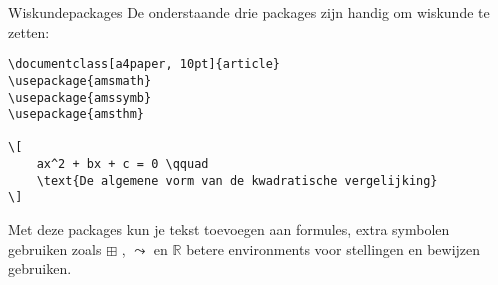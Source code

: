\begin{frame}[fragile]{Wiskundepackages}
De onderstaande drie packages zijn handig om wiskunde te zetten:
\begin{verbatim}
\documentclass[a4paper, 10pt]{article}
\usepackage{amsmath}
\usepackage{amssymb}
\usepackage{amsthm}

\[
    ax^2 + bx + c = 0 \qquad 
    \text{De algemene vorm van de kwadratische vergelijking} 
\]

\end{verbatim}
Met deze packages kun je tekst toevoegen aan formules, 
extra symbolen gebruiken zoals \( \boxplus \) , \( \leadsto \) en \(\mathbb{R}\) betere environments voor stellingen en bewijzen gebruiken.
\end{frame}